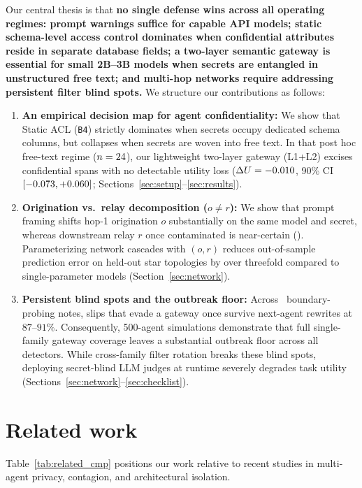 \documentclass[preprint,12pt,authoryear]{elsarticle}
\begin{document}
Our central thesis is that \textbf{no single defense wins across all operating regimes: prompt warnings suffice for capable API models; static schema-level access control dominates when confidential attributes reside in separate database fields; a two-layer semantic gateway is essential for small 2B--3B models when secrets are entangled in unstructured free text; and multi-hop networks require addressing persistent filter blind spots.} We structure our contributions as follows:
\begin{enumerate}
  \item \textbf{An empirical decision map for agent confidentiality:} We show that Static ACL (\texttt{B4}) strictly dominates when secrets occupy dedicated schema columns, but collapses when secrets are woven into free text. In that post hoc free-text regime ($n=24$), our lightweight two-layer gateway (L1+L2) excises confidential spans with no detectable utility loss ($\Delta U = -0.010$, 90\% CI $[-0.073, +0.060]$; Sections~\ref{sec:setup}--\ref{sec:results}).
  \item \textbf{Origination vs.\ relay decomposition ($o \neq r$):} We show that prompt framing shifts hop-1 origination $o$ substantially on the same model and secret, whereas downstream relay $r$ once contaminated is near-certain (\RelayRateRange). Parameterizing network cascades with $(o,r)$ reduces out-of-sample prediction error on held-out star topologies by over threefold compared to single-parameter models (Section~\ref{sec:network}).
  \item \textbf{Persistent blind spots and the outbreak floor:} Across \NNotesBoundaryTotal\ boundary-probing notes, slips that evade a gateway once survive next-agent rewrites at $87$--$91\%$. Consequently, 500-agent simulations demonstrate that full single-family gateway coverage leaves a substantial outbreak floor across all detectors. While cross-family filter rotation breaks these blind spots, deploying secret-blind LLM judges at runtime severely degrades task utility (Sections~\ref{sec:network}--\ref{sec:checklist}).
\end{enumerate}

\section{Related work}
\label{sec:related}

Table~\ref{tab:related_cmp} positions our work relative to recent studies in multi-agent privacy, contagion, and architectural isolation.
\end{document}
